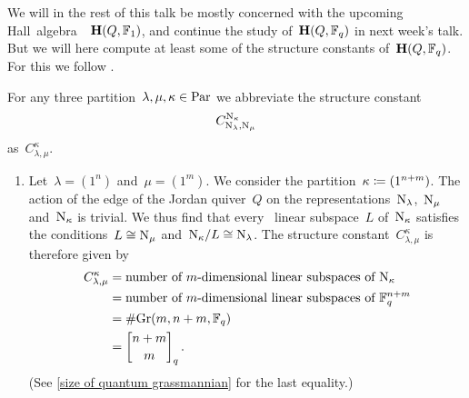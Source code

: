 \documentclass[a4paper,11pt]{scrartcl}
\begin{document}
We will in the rest of this talk be mostly concerned with the upcoming Hall~algebra~~$\mathbf{H}(Q, \mathbb{F}_1)$, and continue the study of~$\mathbf{H}(Q, \mathbb{F}_q)$ in next week’s talk.
But we will here compute at least some of the structure constants of~$\mathbf{H}(Q, \mathbb{F}_q)$.
For this we follow \cite[Example~2.2]{schiffmann_hall}.


\begin{example}
  For any three partition~$\lambda, \mu, \kappa \in \mathrm{Par}$ we abbreviate the structure constant
  \[
    C^{\mathrm{N}_{\kappa}}_{\mathrm{N}_{\lambda}, \mathrm{N}_{\mu}}
  \]
  as~$C^{\kappa}_{\lambda,\mu}$.
  \begin{enumerate}
    \item
      Let~$\lambda = (1^n)$ and~$\mu = (1^m)$.
      We consider the partition~$\kappa \coloneqq (1^{n+m})$.
      The action of the edge of the Jordan quiver~$Q$ on the representations~$\mathrm{N}_\lambda$,~$\mathrm{N}_\mu$ and~$\mathrm{N}_\kappa$ is trivial.
      We thus find that every~ linear subspace~$L$ of~$\mathrm{N}_{\kappa}$ satisfies the conditions~$L \cong \mathrm{N}_\mu$ and~$\mathrm{N}_\kappa / L \cong \mathrm{N}_\lambda$.
      The structure constant~$C^{\kappa}_{\lambda, \mu}$ is therefore given by
      \begin{align*}
        C^{\kappa}_{\lambda, \mu}
        &=
        \text{number of~\dimensional{$m$} linear subspaces of~$\Nil_{\kappa}$}
        \\
        &=
        \text{number of~\dimensional{$m$} linear subspaces of~$\Finite_q^{n+m}$}
        \\
        &=
        \counting {\Gr(m, n+m, \Finite_q)}
        \\
        &=
        \qbinomial{n+m}{m}_q \,.
      \end{align*}
      (See \cref{size of quantum grassmannian} for the last equality.)


\end{enumerate}
\end{example}
\end{document}
